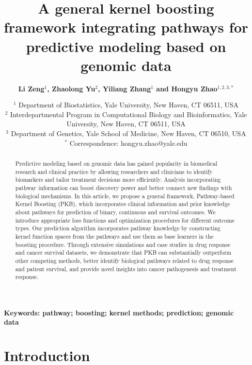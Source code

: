 \documentclass[a4paper,12pt]{article}
\begin{document}
	\title{\bf A general kernel boosting framework integrating pathways for predictive modeling based on genomic data}
	\author{\bf Li Zeng$^{1}$, Zhaolong Yu$^2$, Yiliang Zhang$^1$ and Hongyu Zhao$^{1,2,3,*}$}
	\date{
		$^1$ Department of Biostatistics, Yale University, New Haven, CT 06511, USA\\
	$^2$ Interdepartmental Program in Computational Biology and Bioinformatics, Yale University, New Haven, CT 06511, USA\\
	$^3$ Department of Genetics, Yale School of Medicine, New Haven, CT 06510, USA\\
	$^*$ Correspondence: hongyu.zhao@yale.edu
}
	\maketitle
	\begin{abstract}
Predictive modeling based on genomic data has gained popularity in biomedical research and clinical practice by allowing researchers and clinicians to identify biomarkers and tailor treatment decisions more efficiently. Analysis incorporating pathway information can boost discovery power and better connect new findings with biological mechanisms. In this article, we propose a general framework, Pathway-based Kernel Boosting (PKB), which incorporates clinical information and prior knowledge about pathways for prediction of binary, continuous and survival outcomes. We introduce appropriate loss functions and optimization procedures for different outcome types. Our prediction algorithm incorporates pathway knowledge by constructing kernel function spaces from the pathways and use them as base learners in the boosting procedure. Through extensive simulations and case studies in drug response and cancer survival datasets, we demonstrate that PKB can substantially outperform other competing methods, better identify biological pathways related to drug response and patient survival, and provide novel insights into cancer pathogenesis and treatment response.
		\end{abstract}

		\begin{center}
			\textbf{Keywords: pathway; boosting; kernel methods; prediction; genomic data}
			\end{center}

	

	\section{Introduction}
\end{document}
